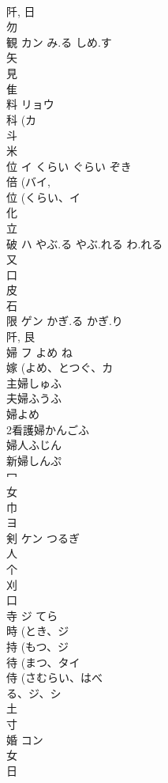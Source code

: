 \documentclass[8pt]{extreport}
\begin{document}
\begin{CJK}{UTF8}{min}
\\	阡, 日 
\\	勿 
\\	観	カン	み.る しめ.す	
\\	矢 
\\	見 
\\	隹 
\\	料	リョウ		
\\	科 (カ 
\\	斗 
\\	米 
\\	位	イ	くらい ぐらい ぞき	
\\	倍 (バイ, 
\\	位 (くらい、イ 
\\	化 
\\	立 
\\	破	ハ	やぶ.る やぶ.れる わ.れる	
\\	又 
\\	口 
\\	皮 
\\	石 
\\	限	ゲン	かぎ.る かぎ.り	
\\	阡, 艮 
\\	婦	フ	よめ ね	
\\	嫁 (よめ、とつぐ、カ 
\\	主婦しゅふ
\\	夫婦ふうふ
\\	婦よめ
\\	2看護婦かんごふ
\\	婦人ふじん
\\	新婦しんぷ
\\	冖 
\\	女 
\\	巾 
\\	ヨ	
\\	剣	ケン	つるぎ	
\\	人 
\\	个 
\\	刈 
\\	口 
\\	寺	ジ	てら	
\\	時 (とき、ジ 
\\	持 (もつ、ジ 
\\	待 (まつ、タイ 
\\	侍 (さむらい、はべ
\\	る、ジ、シ 
\\	土 
\\	寸 
\\	婚	コン		
\\	女 
\\	日 

\end{CJK}
\end{document}
